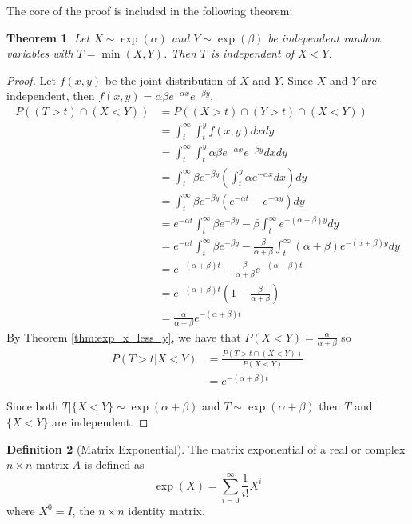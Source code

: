 \documentclass{article}
\theoremstyle{plain}
\newtheorem{theorem}{Theorem}[section]
\theoremstyle{definition}
\newtheorem{defn}[theorem]{Definition}
\theoremstyle{remark}
\numberwithin{equation}{section}
\begin{document}
The core of the proof is included in the following theorem:

\begin{theorem}
Let $X \sim \exp(\alpha)$ and $Y \sim \exp(\beta)$ be independent random variables with $T = \min(X,Y)$.
Then $T$ is independent of $X < Y$.
\end{theorem}

\begin{proof}
Let $f(x,y)$ be the joint distribution of $X$ and $Y$.
Since $X$ and $Y$ are independent, then $f(x,y) = \alpha \beta e^{-\alpha x} e^{-\beta y}$.
\begin{align*}
    P((T > t) \cap (X < Y)) &= P((X > t) \cap (Y > t) \cap (X < Y))\\
    &= \int_t^\infty \int_t^y f(x,y) dx dy\\
    &= \int_t^\infty \int_t^y \alpha \beta e^{-\alpha x} e^{-\beta y} dx dy\\
    &= \int_t^\infty \beta e^{-\beta y} \left(\int_t^y \alpha e^{-\alpha x} dx \right)  dy\\
    &= \int_t^\infty \beta e^{-\beta y} \left( e^{-\alpha t} - e^{-\alpha y} \right) dy\\
    &= e^{-\alpha t} \int_t^\infty \beta e^{-\beta y} - \beta \int_t^\infty e^{-(\alpha + \beta) y} dy\\
    &= e^{-\alpha t} \int_t^\infty \beta e^{-\beta y} - \frac{\beta}{\alpha + \beta} \int_t^\infty (\alpha + \beta) e^{-(\alpha + \beta) y} dy\\
    &= e^{-(\alpha + \beta) t} - \frac{\beta}{\alpha + \beta} e^{-(\alpha + \beta) t}\\
    &= e^{-(\alpha + \beta) t} \left(1 - \frac{\beta}{\alpha + \beta} \right)\\
    &= \frac{\alpha}{\alpha + \beta} e^{-(\alpha + \beta) t}
\end{align*}
By Theorem \ref{thm:exp_x_less_y}, we have that $P(X < Y) = \frac{\alpha}{\alpha + \beta}$ so
\begin{align*}
    P(T > t | X < Y) &= \frac{P(T > t \cap (X < Y))}{P(X < Y)}\\
    &= e^{-(\alpha + \beta) t}
\end{align*}

Since both $T | \{X < Y\} \sim \exp(\alpha + \beta)$ and $T \sim \exp(\alpha + \beta)$ then $T$ and $\{X < Y\}$ are independent.
\end{proof}

\begin{defn}[Matrix Exponential]
The matrix exponential of a real or complex $n \times n$ matrix $A$ is defined as
$$
\exp(X) = \sum_{i = 0}^\infty \frac{1}{i!} X^i
$$
where $X^0 = I$, the $n \times n$ identity matrix.
\end{defn}
\end{document}
